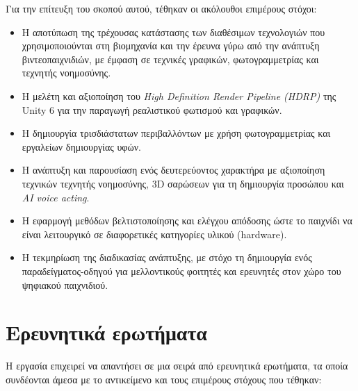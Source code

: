 Για την επίτευξη του σκοπού αυτού, τέθηκαν οι ακόλουθοι επιμέρους
στόχοι:
\begin{itemize}
  \item Η αποτύπωση της τρέχουσας κατάστασης των διαθέσιμων τεχνολογιών
  που χρησιμοποιούνται στη βιομηχανία και την έρευνα γύρω από την
  ανάπτυξη βιντεοπαιχνιδιών, με έμφαση σε τεχνικές γραφικών, φωτογραμμετρίας
  και τεχνητής νοημοσύνης.
  \item Η μελέτη και αξιοποίηση του \textit{High Definition Render
  Pipeline (HDRP)} της Unity 6 για την παραγωγή ρεαλιστικού φωτισμού και
  γραφικών.
  \item Η δημιουργία τρισδιάστατων περιβαλλόντων με χρήση φωτογραμμετρίας
  και εργαλείων δημιουργίας υφών.
  \item Η ανάπτυξη και παρουσίαση ενός δευτερεύοντος χαρακτήρα με
  αξιοποίηση τεχνικών τεχνητής νοημοσύνης, 3D σαρώσεων για τη δημιουργία
  προσώπου και \textit{AI voice acting}.
  \item Η εφαρμογή μεθόδων βελτιστοποίησης και ελέγχου απόδοσης ώστε το
  παιχνίδι να είναι λειτουργικό σε διαφορετικές κατηγορίες υλικού
  (hardware).
  \item Η τεκμηρίωση της διαδικασίας ανάπτυξης, με στόχο τη δημιουργία
  ενός παραδείγματος-οδηγού για μελλοντικούς φοιτητές και ερευνητές στον
  χώρο του ψηφιακού παιχνιδιού.
\end{itemize}
\section{Ερευνητικά ερωτήματα}
Η εργασία επιχειρεί να απαντήσει σε μια σειρά από ερευνητικά
ερωτήματα, τα οποία συνδέονται άμεσα με το αντικείμενο και τους
επιμέρους στόχους που τέθηκαν:

